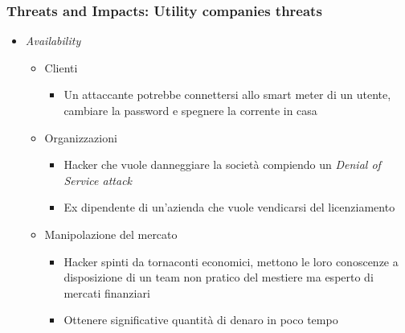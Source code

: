 \begin{frame}
  \frametitle{Threats and Impacts: Utility companies threats}
  \begin{itemize}[<+- | alert@+>]
  \item \textit{Availability}
  \begin{itemize}
	  \item Clienti
	  \begin{itemize}
	  \item Un attaccante potrebbe connettersi allo smart meter di un utente, cambiare la password e spegnere la corrente in casa
	  \end{itemize}
	\item Organizzazioni
		\begin{itemize}
		\item Hacker che vuole danneggiare la società compiendo un \textit{Denial of Service attack}
		\item Ex dipendente di un'azienda che vuole vendicarsi del licenziamento
		\end{itemize}
	\item Manipolazione del mercato
		\begin{itemize}
		\item Hacker spinti da tornaconti economici, mettono le loro conoscenze a disposizione di un team non pratico del mestiere ma esperto di mercati finanziari 
		\item Ottenere significative quantità di denaro in poco tempo
		\end{itemize}
 	\end{itemize}
 \end{itemize}
\end{frame}
